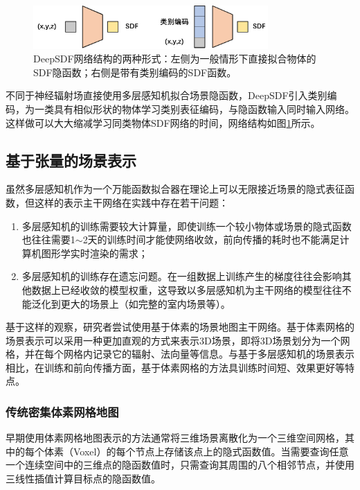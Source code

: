 \begin{figure}[ht]
    \centering
    \includegraphics[width=0.8\textwidth]{undergraduate-thesis/images/related-work/deepSDF.pdf}
    \caption{DeepSDF\cite{park_deepsdf_2019}网络结构的两种形式：左侧为一般情形下直接拟合物体的SDF隐函数；右侧是带有类别编码的SDF函数。}
    \label{fig:related-work DeepSDF}
\end{figure}

不同于神经辐射场直接使用多层感知机拟合场景隐函数，DeepSDF引入类别编码，为一类具有相似形状的物体学习类别表征编码，与隐函数输入同时输入网络。这样做可以大大缩减学习同类物体SDF网络的时间，网络结构如图\ref{fig:related-work DeepSDF}所示。



\subsection{基于张量的场景表示}
\label{sec: related-work grid-based implicit representations}
虽然多层感知机作为一个万能函数拟合器在理论上可以无限接近场景的隐式表征函数，但这样的表示主干网络在实践中存在若干问题：
\begin{enumerate}
    \item 多层感知机的训练需要较大计算量，即使训练一个较小物体或场景的隐式函数也往往需要1$\sim$2天的训练时间才能使网络收敛，前向传播的耗时也不能满足计算机图形学实时渲染的需求；
    \item 多层感知机的训练存在遗忘问题。在一组数据上训练产生的梯度往往会影响其他数据上已经收敛的模型权重，这导致以多层感知机为主干网络的模型往往不能泛化到更大的场景上（如完整的室内场景等）。
\end{enumerate}

基于这样的观察，研究者尝试使用基于体素的场景地图主干网络。基于体素网格的场景表示可以采用一种更加直观的方式来表示3D场景，即将3D场景划分为一个网格，并在每个网格内记录它的辐射、法向量等信息。与基于多层感知机的场景表示相比，在训练和前向传播方面，基于体素网格的方法具训练时间短、效果更好等特点。

\subsubsection{传统密集体素网格地图}
早期使用体素网格地图表示的方法\cite{fridovich-keil_plenoxels_2022, kondo_vaxnerf_2021, yu_monosdf_2022}通常将三维场景离散化为一个三维空间网格，其中的每个体素（Voxel）的每个节点上存储该点上的隐式函数值。当需要查询任意一个连续空间中的三维点的隐函数值时，只需查询其周围的八个相邻节点，并使用三线性插值计算目标点的隐函数值。

